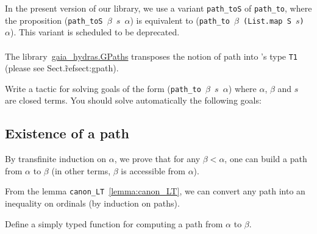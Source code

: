 

\begin{remark}
In the present version of our library, we use a variant \texttt{path\_toS} of
\texttt{path\_to}, where the proposition
(\texttt{path\_toS $\beta$ $s$ $\alpha$}) is equivalent to
(\texttt{path\_to $\beta$ (List.map S $s$) $\alpha$}). This variant is scheduled to be deprecated.
\end{remark}

\paragraph*{\gaiasign}
The library~\href{../theories/html/gaia_hydras.GPaths.html}{gaia\_hydras.GPaths} transposes the  notion of path into \gaia's type \texttt{T1}
(please see Sect.\~ref{sect:gpath}).



\begin{exercise}
Write a tactic for solving goals of the form (\texttt{path\_to $\beta$ $s$ $\alpha$})
where $\alpha$, $\beta$ and $s$ are closed terms. 
You should solve automatically the following goals:

\end{exercise}



\subsection{Existence of a path}


By transfinite induction on $\alpha$, we prove that for any $\beta<\alpha$, 
one can build a path from $\alpha$ to $\beta$ (in other terms, $\beta$ is accessible from $\alpha$).





\noindent 
From the lemma \texttt{canon\_LT}~\vref{lemma:canon_LT}, we can convert any path into an inequality on ordinals (by induction on paths).




\begin{exercise}
Define a simply typed function for computing a path from $\alpha$ to $\beta$.
\end{exercise}

